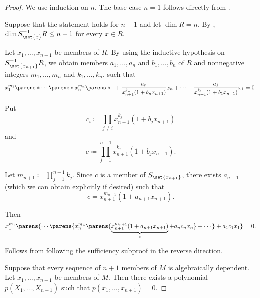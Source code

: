 \begin{proof}
  \SufficiencySubProof* We use induction on \( n \). The base case \( n = 1 \) follows directly from .

  Suppose that the statement holds for \( n - 1 \) and let \( \dim R = n \). By , \( \dim S_{\set{ x }}^{-1} R \leq n - 1 \) for every \( x \in R \).

  Let \( x_1, \ldots, x_{n+1} \) be members of \( R \). By using the inductive hypothesis on \( S_{\set{ x_{n+1} }}^{-1} R \), we obtain members \( a_1, \ldots, a_n \) and \( b_1, \ldots, b_n \) of \( R \) and nonnegative integers \( m_1, \ldots, m_n \) and \( k_1, \ldots, k_n \), such that
  \begin{equation*}
    x_1^{m_1} \parens*{ \cdots \parens*{ x_n^{m_n} \parens*{ 1 + \frac {a_n} {x_{n+1}^{k_n} (1 + b_n x_{n+1}) } x_n } + \cdots } + \frac {a_1} {x_{n+1}^{k_1} (1 + b_1 x_{n+1}) } x_1 } = 0.
  \end{equation*}

  Put
  \begin{equation*}
    c_i \coloneqq \prod_{j \neq i} x_{n+1}^{k_j} (1 + b_j x_{n+1})
  \end{equation*}
  and
  \begin{equation*}
    c \coloneqq \prod_{j=1}^{n+1} x_{n+1}^{k_j} (1 + b_j x_{n+1}).
  \end{equation*}

  Let \( m_{n+1} \coloneqq \prod_{j=1}^{n+1} k_j \). Since \( c \) is a member of \( S_{\set{ x_{n+1} }} \), there exists \( a_{n+1} \) (which we can obtain explicitly if desired) such that
  \begin{equation*}
    c = x_{n+1}^{m_{n+1}} (1 + a_{n+1} x_{n+1}).
  \end{equation*}

  Then
  \begin{equation*}
    x_1^{m_1} \parens{ \cdots \parens{ x_n^{m_n} \parens{ \underbrace{ x_{n+1}^{m_{n+1}} (1 + a_{n+1} x_{n+1}) }_c + a_n c_n x_n } + \cdots } + a_1 c_1 x_1 } = 0.
  \end{equation*}

  \NecessitySubProof* Follows from following the sufficiency subproof in the reverse direction.

   Suppose that every sequence of \( n + 1 \) members of \( M \) is algebraically dependent. Let \( x_1, \ldots, x_{n+1} \) be members of \( M \). Then there exists a polynomial \( p(X_1, \ldots, X_{n+1}) \) such that \( p(x_1, \ldots, x_{n+1}) = 0 \).


\end{proof}
